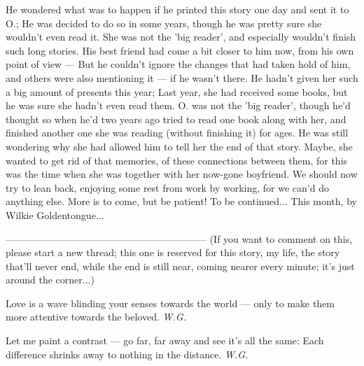 He wondered what was to happen if he printed this story one day and sent it to O.; He was decided to do so in some years, though he was pretty sure she wouldn't even read it. She was not the 'big reader', and especially wouldn't finish such long stories. 
His best friend had come a bit closer to him now, from his own point of view --- But he couldn't ignore the changes that had taken hold of him, and others were also mentioning it --- if he wasn't there. 
He hadn't given her such a big amount of presents this year; Last year, she had received some books, but he was sure she hadn't even read them. O. was not the 'big reader', though he'd thought so when he'd two years ago tried to read one book along with her, and finished another one she was reading (without finishing it) for ages. He was still wondering why she had allowed him to tell her the end of that story. 
Maybe, she wanted to get rid of that memories, of these connections between them, for this was the time when she was together with her now-gone boyfriend. 
We should now try to lean back, enjoying some rest from work by working, for we can'd do anything else. More is to come, but be patient! 
To be continued...
This month, by Wilkie Goldentongue...

--------------------------------------------------------------
(If you want to comment on this, please start a new thread; this one is reserved for this story, my life, the story that'll never end, while the end is still near, coming nearer every minute; it's just around the corner...)

Love is a wave 
blinding your senses 
towards the world --- 
only to make them more attentive 
towards the beloved. 
\emph{W.G.}

Let me paint a contrast --- 
go far, far away 
and see it's all the same: 
Each difference shrinks away 
to nothing 
in the distance. 
\emph{W.G.}
